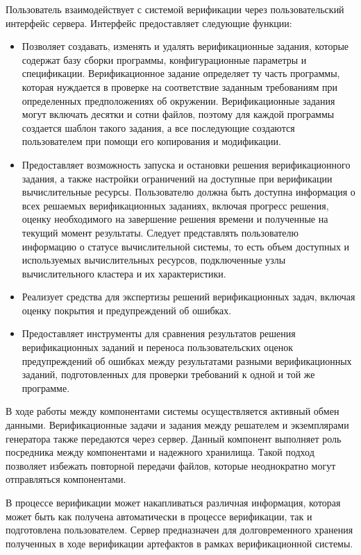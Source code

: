 Пользователь взаимодействует с системой верификации через пользовательский интерфейс сервера.
Интерфейс предоставляет следующие функции:
\begin{itemize}
\item Позволяет создавать, изменять и удалять верификационные задания, которые содержат базу сборки программы, конфигурационные параметры и спецификации. 
Верификационное задание определяет ту часть программы, которая нуждается в проверке на соответствие заданным требованиям при определенных предположениях об окружении.
Верификационные задания могут включать десятки и сотни файлов, поэтому для каждой программы создается шаблон такого задания, а все последующие создаются пользователем при помощи его копирования и модификации.
\item Предоставляет возможность запуска и остановки решения верификационного задания, а также настройки ограничений на доступные при верификации вычислительные ресурсы. 
Пользователю должна быть доступна информация о всех решаемых верификационных заданиях, включая прогресс решения, оценку необходимого на завершение решения времени и полученные на текущий момент результаты.
Следует представлять пользователю информацию о статусе вычислительной системы, то есть объем доступных и используемых вычислительных ресурсов, подключенные узлы вычислительного кластера и их характеристики.
\item Реализует средства для экспертизы решений верификационных задач, включая оценку покрытия и предупреждений об ошибках.
\item Предоставляет инструменты для сравнения результатов решения верификационных заданий и переноса пользовательских оценок предупреждений об ошибках между результатами разными верификационных заданий, подготовленных для проверки требований к одной и той же программе.
\end{itemize}

В ходе работы между компонентами системы осуществляется активный обмен данными.
Верификационные задачи и задания между решателем и экземплярами генератора также передаются через сервер.
Данный компонент выполняет роль посредника между компонентами и надежного хранилища.
Такой подход позволяет избежать повторной передачи файлов, которые неоднократно могут отправляться компонентами.

В процессе верификации может накапливаться различная информация, которая может быть как получена автоматически в процессе верификации, так и подготовлена пользователем. 
Сервер предназначен для долговременного хранения полученных в ходе верификации артефактов в рамках верификационной системы.

